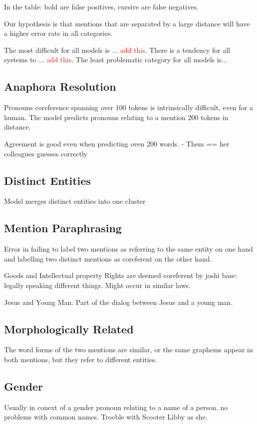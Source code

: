 \documentclass[11pt]{article}
\newcommand\todo[1]{\textcolor{red}{#1}}
\begin{document}
In the table: bold are false positives, cursive are false negatives.

Our hypothesis is that mentions that are separated by a large distance will have a higher error rate in all categories. 

The most difficult for all models is ... \todo{add this}. There is a tendency for all systems to ... \todo{add this}. The least problematic category for all models is... 

\subsection{Anaphora Resolution}

Pronouns coreference spanning over 100 tokens is intrinsically difficult, even for a human. The model predicts pronouns relating to a mention 200 tokens in distance. 

Agreement is good even when predicting oven 200 words. - Them == her colleagues guesses correctly


\subsection{Distinct Entities} Model merges distinct entities into one cluster 

\subsection{Mention Paraphrasing} Error in failing to label two mentions as referring to the same entity on one hand and labelling two distinct mentions as coreferent on the other hand.

Goods and Intellectual property Rights are deemed coreferent by joshi base: legally speaking different things. Might occur in similar laws.

Jesus and Young Man. Part of the dialog between Jesus and a young man.

\subsection{Morphologically Related} 
The word forms of the two mentions are similar, or the same graphems appear in both mentions, but they refer to different entities.

\subsection{Gender}
Usually in conext of a gender pronoun relating to a name of a person.
no problems with common names. Troeble with Scooter Libby as she.
\end{document}
